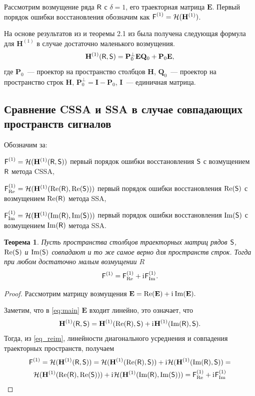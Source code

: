\documentclass[specialist,
               substylefile = spbu.rtx,
               subf,href,colorlinks=true, 12pt]{disser}
\newtheorem{theorem}{Теорема}
\begin{document}
Рассмотрим возмущение ряда $\textsf{R}$ с $\delta = 1$, его траекторная матрица $\mathbf{E}$. Первый порядок ошибки восстановления обозначим как $\textsf{F}^{(1)} = \mathcal{H}(\mathbf{H}^{(1)})$.

На основе результатов из \cite[стр.12]{Konstantinov} и теоремы 2.1 из \cite{Nekrutkin} была получена следующая формула для $\mathbf{H}^{(1)}$ в случае достаточно маленького возмущения.
\begin{equation} \label{eq:main}
	\mathbf{H}^{(1)}(\textsf{R}, \textsf{S}) = \mathbf{P}^{\perp}_0 \mathbf{E} \mathbf{Q}_0 + \mathbf{P}_0 \mathbf{E},
\end{equation}
где $\mathbf{P}_0$~--- проектор на пространство столбцов $\mathbf{H}$, $\mathbf{Q}_0$~--- проектор на пространство строк $\mathbf{H}$, $\mathbf{P}^{\perp}_0 = \mathbf{I} - \mathbf{P}_0$, $\mathbf{I}$~--- единичная матрица.


\subsection{Сравнение CSSA и SSA в случае совпадающих пространств сигналов}

Обозначим за:

$\textsf{F}^{(1)} = \mathcal{H}(\mathbf{H}^{(1)}(\textsf{R}, \textsf{S}))$ первый порядок ошибки восстановления $\textsf{S}$ с возмущением $\textsf{R}$ метода CSSA,

$\textsf{F}^{(1)}_{\Re} = \mathcal{H}(\mathbf{H}^{(1)}(\Re(\textsf{R}), \Re(\textsf{S})))$ первый порядок ошибки восстановления $\Re(\textsf{S})$ с возмущением $\Re(\textsf{R})$ метода SSA,

$\textsf{F}^{(1)}_{\Im} = \mathcal{H}(\mathbf{H}^{(1)}(\Im(\textsf{R}), \Im(\textsf{S})))$ первый порядок ошибки восстановления $\Im(\textsf{S})$ с возмущением $\Im(\textsf{R})$ метода SSA.


\begin{theorem}\label{th:sum}
	Пусть пространства столбцов траекторных матриц рядов $\textsf{S}$, $\Re(\textsf{S})$ и $\Im(\textsf{S})$ совпадают и то же самое верно для пространств строк.
	Тогда при любом достаточно малым возмущении $R$ $$\textsf{F}^{(1)} = \textsf{F}^{(1)}_{\Re} + \mathrm{i}\mkern1mu\textsf{F}^{(1)}_{\Im}.$$
\end{theorem}
\begin{proof}
	Рассмотрим матрицу возмущения $\mathbf{E} = \Re(\mathbf{E}) + \mathrm{i}\mkern1mu\Im(\mathbf{E}).$
	
	Заметим, что в \eqref{eq:main} $\mathbf{E}$ входит линейно, это означает, что
	\begin{equation} \label{eq_reim}
		\mathbf{H}^{(1)}(\textsf{R}, \textsf{S}) = \mathbf{H}^{(1)}(\Re(\textsf{R}), \textsf{S}) + \mathrm{i}\mkern1mu\mathbf{H}^{(1)}(\Im(\textsf{R}), \textsf{S}).
	\end{equation}
	Тогда, из \eqref{eq_reim}, линейности диагонального усреднения и  совпадения траекторных пространств, получаем
	\begin{multline*}
		\textsf{F}^{(1)} = \mathcal{H}(\mathbf{H}^{(1)}(\textsf{R}, \textsf{S})) = \mathcal{H}(\mathbf{H}^{(1)}(\Re(\textsf{R}), \textsf{S})) + \mathrm{i}\mkern1mu\mathcal{H}(\mathbf{H}^{(1)}(\Im(\textsf{R}), \textsf{S})) =\\
		\mathcal{H}(\mathbf{H}^{(1)}(\Re(\textsf{R}), \Re(\textsf{S}))) + \mathrm{i}\mkern1mu\mathcal{H}(\mathbf{H}^{(1)}(\Im(\textsf{R}), \Im(\textsf{S}))) = \textsf{F}^{(1)}_{\Re} + \mathrm{i}\mkern1mu\textsf{F}^{(1)}_{\Im}	
	\end{multline*}
	
\end{proof}
\end{document}
